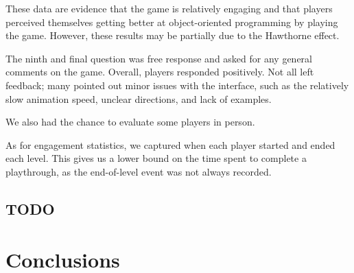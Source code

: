\documentclass[12pt,notitlepage]{article}
\begin{document}
These data are evidence that the game is relatively engaging and that players
perceived themselves getting better at object-oriented programming by playing
the game. However, these results may be partially due to the Hawthorne effect.

The ninth and final question was free response and asked for any general
comments on the game. Overall, players responded positively. Not all left
feedback; many pointed out minor issues with the interface, such as the
relatively slow animation speed, unclear directions, and lack of examples.

We also had the chance to evaluate some players in person.

As for engagement statistics, we captured when each player started and
ended each level. This gives us a lower bound on the time spent to
complete a playthrough, as the end-of-level event was not always
recorded.

\subsection{TODO}

\section{Conclusions}
\end{document}
